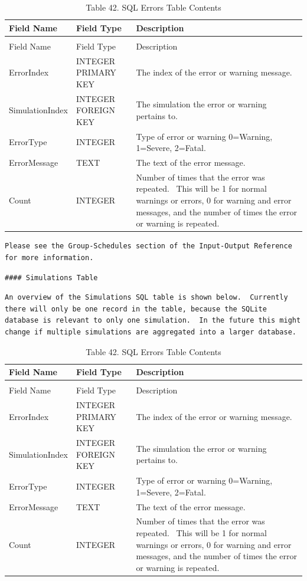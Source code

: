 \begin{longtable}[c]{p{1.5in}p{1.5in}p{2.99in}}
\caption{Table 42. SQL Errors Table Contents \label{table:table-42.-sql-errors-table-contents}} \tabularnewline
\toprule 
Field Name & Field Type & Description \tabularnewline
\midrule
\endfirsthead

\caption[]{Table 42. SQL Errors Table Contents} \tabularnewline
\toprule 
Field Name & Field Type & Description \tabularnewline
\midrule
\endhead

ErrorIndex & INTEGER PRIMARY KEY & The index of the error or warning message. \tabularnewline
SimulationIndex & INTEGER FOREIGN KEY & The simulation the error or warning pertains to. \tabularnewline
ErrorType & INTEGER & Type of error or warning 0=Warning, 1=Severe, 2=Fatal. \tabularnewline
ErrorMessage & TEXT & The text of the error message. \tabularnewline
Count & INTEGER & Number of times that the error was repeated.~ This will be 1 for normal warnings or errors, 0 for warning and error messages, and the number of times the error or warning is repeated. \tabularnewline
\bottomrule
\end{longtable}

\begin{lstlisting}
Please see the Group-Schedules section of the Input-Output Reference for more information.
\end{lstlisting}

\begin{lstlisting}
#### Simulations Table
\end{lstlisting}

\begin{lstlisting}
An overview of the Simulations SQL table is shown below.  Currently there will only be one record in the table, because the SQLite database is relevant to only one simulation.  In the future this might change if multiple simulations are aggregated into a larger database.
\end{lstlisting}

\begin{longtable}[c]{p{1.5in}p{1.5in}p{2.99in}}
\caption{Table 42. SQL Errors Table Contents \label{table:table-42.-sql-errors-table-contents}} \tabularnewline
\toprule 
Field Name & Field Type & Description \tabularnewline
\midrule
\endfirsthead

\caption[]{Table 42. SQL Errors Table Contents} \tabularnewline
\toprule 
Field Name & Field Type & Description \tabularnewline
\midrule
\endhead

ErrorIndex & INTEGER PRIMARY KEY & The index of the error or warning message. \tabularnewline
SimulationIndex & INTEGER FOREIGN KEY & The simulation the error or warning pertains to. \tabularnewline
ErrorType & INTEGER & Type of error or warning 0=Warning, 1=Severe, 2=Fatal. \tabularnewline
ErrorMessage & TEXT & The text of the error message. \tabularnewline
Count & INTEGER & Number of times that the error was repeated.~ This will be 1 for normal warnings or errors, 0 for warning and error messages, and the number of times the error or warning is repeated. \tabularnewline
\bottomrule
\end{longtable}

